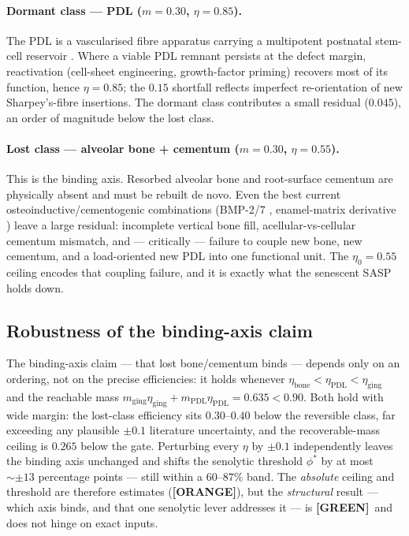 \documentclass[11pt,a4paper]{article}
\newcommand{\tierbadge}[2]{\textcolor{#1}{\textbf{[#2]}}}
\providecommand{\tierGreen}{\tierbadge{green!45!black}{GREEN}}
\providecommand{\tierOrange}{\tierbadge{orange!80!black}{ORANGE}}
\begin{document}
\paragraph{Dormant class --- PDL ($m=0.30$, $\eta=0.85$).} The PDL is a vascularised
fibre apparatus carrying a multipotent postnatal stem-cell reservoir \citep{seo2004}.
Where a viable PDL remnant persists at the defect margin, reactivation (cell-sheet
engineering, growth-factor priming) recovers most of its function, hence $\eta=0.85$;
the $0.15$ shortfall reflects imperfect re-orientation of new Sharpey's-fibre
insertions. The dormant class contributes a small residual ($0.045$), an order of
magnitude below the lost class.
\paragraph{Lost class --- alveolar bone + cementum ($m=0.30$, $\eta=0.55$).} This is
the binding axis. Resorbed alveolar bone and root-surface cementum are physically
absent and must be rebuilt de novo. Even the best current osteoinductive/cementogenic
combinations (BMP-2/7 \citep{wozney1988}, enamel-matrix derivative
\citep{hammarstrom1997}) leave a large residual: incomplete vertical bone fill,
acellular-vs-cellular cementum mismatch, and --- critically --- failure to couple new
bone, new cementum, and a load-oriented new PDL into one functional unit. The $\eta_0
= 0.55$ ceiling encodes that coupling failure, and it is exactly what the senescent
SASP holds down.

\subsection{Robustness of the binding-axis claim}
\label{sec:robust}
The binding-axis claim --- that lost bone/cementum binds --- depends only on an
ordering, not on the precise efficiencies: it holds whenever
$\eta_{\text{bone}}<\eta_{\text{PDL}}<\eta_{\text{ging}}$ and the reachable mass
$m_{\text{ging}}\eta_{\text{ging}}+m_{\text{PDL}}\eta_{\text{PDL}}=0.635<0.90$. Both
hold with wide margin: the lost-class efficiency sits $0.30$--$0.40$ below the
reversible class, far exceeding any plausible $\pm 0.1$ literature uncertainty, and
the recoverable-mass ceiling is $0.265$ below the gate. Perturbing every $\eta$ by
$\pm 0.1$ independently leaves the binding axis unchanged and shifts the senolytic
threshold $\phi^\ast$ by at most ${\sim}\pm 13$ percentage points --- still within a
$60$--$87\%$ band. The \emph{absolute} ceiling and threshold are therefore estimates
(\tierOrange), but the \emph{structural} result --- which axis binds, and that one
senolytic lever addresses it --- is \tierGreen\ and does not hinge on exact inputs.
\end{document}
